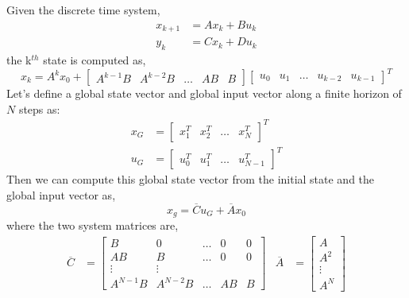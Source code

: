 \documentclass{article}
\newcommand{\doublebar}[1]{\overline{#1}}
\begin{document}
Given the discrete time system,
\begin{align}
    x_{k+1} &= Ax_k + Bu_k \\
    y_k &= Cx_k + Du_k
\end{align}
the k$^{th}$ state is computed as,
\begin{equation}
    x_k = A^kx_0 + \begin{bmatrix} A^{k-1}B & A^{k-2}B & \ldots & AB & B \end{bmatrix}
        \begin{bmatrix} u_0 & u_1 & \ldots & u_{k-2} & u_{k-1} \end{bmatrix}^T
\end{equation}
Let's define a global state vector and global input vector along a finite horizon of $N$ steps as:
\begin{align}
    x_G &= \begin{bmatrix} x_1^T & x_2^T & \ldots & x_N^T \end{bmatrix}^T
    \label{eq:global-state} \\
    u_G &= \begin{bmatrix} u_0^T & u_1^T & \ldots & u_{N-1}^T \end{bmatrix}^T
    \label{eq:global-input}
\end{align}
Then we can compute this global state vector from the initial state and the global input vector as,
\begin{equation}
    x_g = \doublebar{C}u_G + \doublebar{A}x_0
    \label{eq:global-system}
\end{equation}
where the two system matrices are,
\begin{align}
    \doublebar{C} &= \begin{bmatrix}
        B         & 0        & \ldots & 0      & 0 \\
        AB        & B        & \ldots & 0      & 0 \\
        \vdots    & \vdots   &        &        &   \\
         A^{N-1}B & A^{N-2}B & \ldots & AB     & B
    \end{bmatrix} &
    \doublebar{A} &= \begin{bmatrix}
        A \\ A^2 \\ \vdots \\ A^N
    \end{bmatrix}
\end{align}
\end{document}
